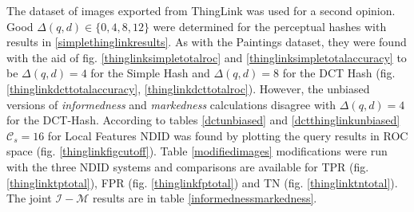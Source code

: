 \documentclass[english,12pt,a4paper,pdftex,elec,utf8, table]{aaltothesis}
\begin{document}

The dataset of images exported from ThingLink was used for a second opinion. Good $\Delta(q,d) \in \{0,4,8,12\}$ were determined for the perceptual hashes with results in \ref{simplethinglinkresults}. As with the Paintings dataset, they were found with the aid of fig. \ref{thinglinksimpletotalroc} and \ref{thinglinksimpletotalaccuracy} to be $\Delta(q,d)=4$ for the Simple Hash and $\Delta(q,d)=8$ for the DCT Hash (fig. \ref{thinglinkdcttotalaccuracy}, \ref{thinglinkdcttotalroc}). However, the unbiased versions of \emph{informedness} and \emph{markedness} calculations disagree with $\Delta(q,d)=4$ for the DCT-Hash. According to tables \ref{dctunbiased} and \ref{dctthinglinkunbiased} $\mathcal{C}_s=16$ for Local Features NDID was found by plotting the query results in ROC space (fig. \ref{thinglinkfigcutoff}). Table \ref{modifiedimages} modifications were run with the three NDID systems and comparisons are available for TPR (fig. \ref{thinglinktptotal}), FPR (fig. \ref{thinglinkfptotal}) and TN (fig. \ref{thinglinktntotal}). The joint $\mathcal{I}-\mathcal{M}$ results are in table \ref{informednessmarkedness}.


\end{document}
